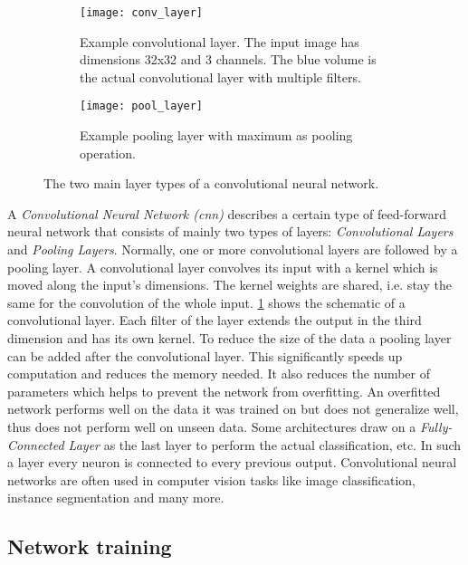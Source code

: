 \begin{figure}[!tbp]
	\centering
	\begin{subfigure}[t]{0.45\textwidth}
		\centering
    	\texttt{[image: conv\_layer]}
    	\caption{Example convolutional layer. The input image has dimensions 32x32 and 3 channels. The blue volume is the actual convolutional layer with multiple filters.}
    	\label{fig:conv_layer}
	\end{subfigure}
	\hfill
	\begin{subfigure}[t]{0.5\textwidth}
		\centering
    	\texttt{[image: pool\_layer]}
    	\caption{Example pooling layer with maximum as pooling operation.}
    	\label{fig:pool_layer}
	\end{subfigure}
	\caption{The two main layer types of a convolutional neural network.}
\end{figure} 

A \textit{Convolutional Neural Network (\gls{cnn})} describes a certain type of feed-forward neural network that consists of mainly two types of layers: \textit{Convolutional Layers} and \textit{Pooling Layers}. Normally, one or more convolutional layers are followed by a pooling layer. A convolutional layer convolves its input with a kernel which is moved along the input's dimensions. The kernel weights are shared, i.e. stay the same for the convolution of the whole input. \fig \ref{fig:conv_layer} shows the schematic of a convolutional layer. Each filter of the layer extends the output in the third dimension and has its own kernel. To reduce the size of the data a pooling layer can be added after the convolutional layer. This significantly speeds up computation and reduces the memory needed. It also reduces the number of parameters which helps to prevent the network from overfitting. An overfitted network performs well on the data it was trained on but does not generalize well, thus does not perform well on unseen data. Some architectures draw on a \textit{Fully-Connected Layer} as the last layer to perform the actual classification, etc. In such a layer every neuron is connected to every previous output. Convolutional neural networks are often used in computer vision tasks like image classification, instance segmentation and many more.

\subsection{Network training} \label{section:network_training}

